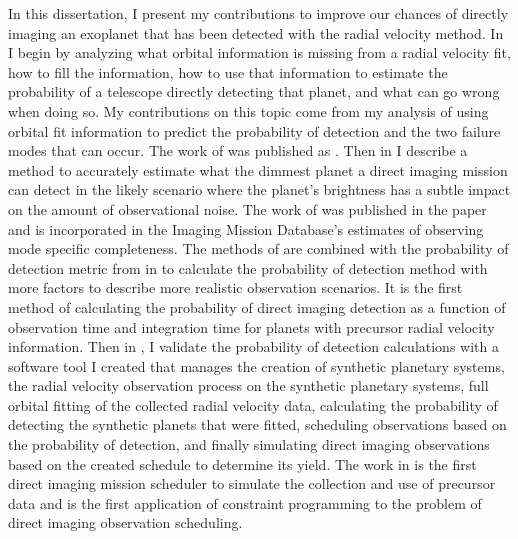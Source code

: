 In this dissertation, I present my contributions to improve our chances of
directly imaging an exoplanet that has been detected with the radial velocity
method. In  I begin by analyzing what orbital information
is missing from a radial velocity fit, how to fill the information, how to use
that information to estimate the probability of a telescope directly detecting
that planet, and what can go wrong when doing so. My contributions on this
topic come from my analysis of using orbital fit information to predict the
probability of detection and the two failure modes that can occur. The work of
 was published as \citet{spohnSchedulingDirect2022}. Then
in  I describe a method to accurately estimate what the
dimmest planet a direct imaging mission can detect in the likely scenario where
the planet's brightness has a subtle impact on the amount of observational
noise. The work of  was published in the paper
\citet{spohnDirectImaging2022} and is incorporated in the Imaging Mission
Database's \citep{savranskyExplorationDynamical2019} estimates of observing
mode specific completeness. The methods of  are combined
with the probability of detection metric from  in
 to calculate the probability of detection method with
more factors to describe more realistic observation scenarios. It is the first
method of calculating the probability of direct imaging detection as a function
of observation time and integration time for planets with precursor radial
velocity information. Then in , I validate the
probability of detection calculations with a software tool I created that
manages the creation of synthetic planetary systems, the radial velocity
observation process on the synthetic planetary systems, full orbital fitting of
the collected radial velocity data, calculating the probability of detecting
the synthetic planets that were fitted, scheduling observations based on the
probability of detection, and finally simulating direct imaging observations
based on the created schedule to determine its yield. The work in
 is the first direct imaging mission scheduler to
simulate the collection and use of precursor data and is the first application
of constraint programming to the problem of direct imaging observation
scheduling.
